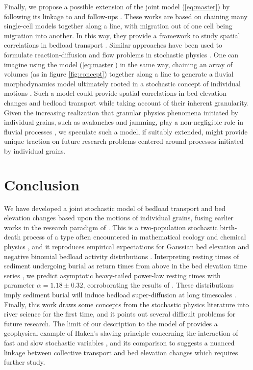 \documentclass[draft]{agujournal2018}
\begin{document}
Finally, we propose a possible extension of the joint model (\ref{eq:master}) by following its linkage to \citet{Ancey2008} and follow-ups \citep[e.g.,][]{Ancey2014a, Heyman2014, Heyman2015}.
These works are based on chaining many \citet{Ancey2008} single-cell models together along a line, with migration out of one cell being migration into another.
In this way, they provide a framework to study spatial correlations in bedload transport \citep[e.g.,][]{Heyman2014,Heyman2015}.
Similar approaches have been used to formulate reaction-diffusion and flow problems in stochastic physics \citep[e.g.,][]{Gardiner1983}. 
One can imagine using the model (\ref{eq:master}) in the same way, chaining an array of volumes (as in figure \ref{fig:concept}) together along a line to generate a fluvial morphodynamics model ultimately rooted in a stochastic concept of individual motions \citep[e.g.,][]{Einstein1937}.
Such a model could provide spatial correlations in bed elevation changes and bedload transport while taking account of their inherent granularity.
Given the increasing realization that granular physics phenomena initiated by individual grains, such as avalanches and jamming, play a non-negligible role in fluvial processes \citep[e.g.,][]{Saletti2016,Dhont2018}, we speculate such a model, if suitably extended, might provide unique traction on future research problems centered around processes initiated by individual grains.


\section{Conclusion}

We have developed a joint stochastic model of bedload transport and bed elevation changes based upon the motions of individual grains, fusing earlier works in the research paradigm of \citet{Einstein1937}.
This is a two-population stochastic birth-death process of a type often encountered in mathematical ecology \citep[e.g.,][]{Pielou1977} and chemical physics \citep[e.g.,][]{Gardiner1983}, and it reproduces empirical expectations for Gaussian bed elevation and negative binomial bedload activity distributions \citep[e.g.,][]{Wong2007,Ancey2008}.
Interpreting resting times of sediment undergoing burial as return times from above in the bed elevation time series \citep[e.g.,][]{Voepel2013}, we predict asymptotic heavy-tailed power-law resting times with parameter $\alpha = 1.18 \pm 0.32$, corroborating the results of \citet{Martin2014}.
These distributions imply sediment burial will induce bedload super-diffusion at long timescales \citep[e.g.,][]{Phillips2013}.
Finally, this work draws some concepts from the stochastic physics literature into river science for the first time, and it points out several difficult problems for future research.
The limit of our description to the model of \citet{Martin2014} provides a geophysical example of Haken's slaving principle concerning the interaction of fast and slow stochastic variables \citep{Haken1983}, and its comparison to \citet{Ancey2008} suggests a nuanced linkage between collective transport and bed elevation changes which requires further study.
\end{document}
